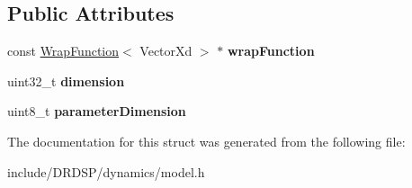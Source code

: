 \subsection*{Public Attributes}
\begin{DoxyCompactItemize}
\item 
\hypertarget{struct_d_r_d_s_p_1_1_model_parameterized_c_w_a185304f801d2372b66f5f08f4458a684}{const \hyperlink{struct_d_r_d_s_p_1_1_wrap_function}{Wrap\-Function}$<$ Vector\-Xd $>$ $\ast$ {\bfseries wrap\-Function}}\label{struct_d_r_d_s_p_1_1_model_parameterized_c_w_a185304f801d2372b66f5f08f4458a684}

\item 
\hypertarget{struct_d_r_d_s_p_1_1_model_parameterized_c_w_ac840c2c4704f71998043ea2c27fa6b8b}{uint32\-\_\-t {\bfseries dimension}}\label{struct_d_r_d_s_p_1_1_model_parameterized_c_w_ac840c2c4704f71998043ea2c27fa6b8b}

\item 
\hypertarget{struct_d_r_d_s_p_1_1_model_parameterized_c_w_a618fb5f5113e0a04bec9cd2221f30b00}{uint8\-\_\-t {\bfseries parameter\-Dimension}}\label{struct_d_r_d_s_p_1_1_model_parameterized_c_w_a618fb5f5113e0a04bec9cd2221f30b00}

\end{DoxyCompactItemize}


The documentation for this struct was generated from the following file\-:\begin{DoxyCompactItemize}
\item 
include/\-D\-R\-D\-S\-P/dynamics/model.\-h\end{DoxyCompactItemize}
